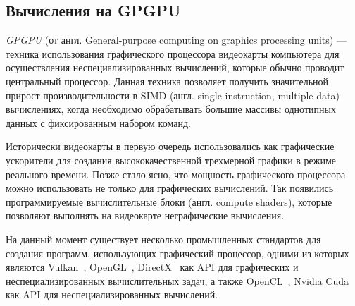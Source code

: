 

\subsection{Вычисления на GPGPU}

\textit{GPGPU} (от англ. General-purpose computing on graphics processing units) --- техника использования графического процессора видеокарты компьютера для осуществления неспециализированных вычислений, 
которые обычно проводит центральный процессор. 
Данная техника позволяет получить значительной прирост производительности в SIMD (англ. single instruction, multiple data) вычислениях, 
когда необходимо обрабатывать большие массивы однотипных данных с фиксированным набором команд.

Исторически видеокарты в первую очередь использовались как графические ускорители для создания высококачественной трехмерной графики в режиме реального времени. Позже стало ясно, что мощность графического процессора можно использовать не только для графических вычислений. Так появились программируемые вычислительные блоки (англ. compute shaders), которые позволяют выполнять на видеокарте неграфические вычисления.

На данный момент существует несколько промышленных стандартов для создания программ, использующих графический процессор, одними из которых являются Vulkan~\cite{net:spec_vulkan}, OpenGL~\cite{net:spec_opengl}, DirectX~\cite{net:spec_direct3d} как API для графических и неспециализированных вычислительных задач, а также OpenCL~\cite{net:spec_opencl}, Nvidia Cuda~\cite{net:cuda_toolkit_docs} как API для неспециализированных вычислений. 

